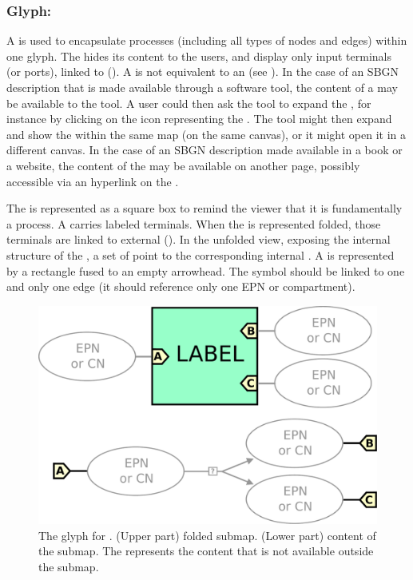 \subsubsection{Glyph: }
\label{sec:submap}

A  is used to encapsulate processes (including all types of nodes and edges) within one glyph.  The  hides its content to the users, and display only input terminals (or ports), linked to  (). A  is not equivalent to an  (see ).  
In the case of an SBGN description that is made available through a software tool, the content of a  may be available to the tool.  A user could then ask the tool to expand the , for instance by clicking on the icon representing the .  The tool might then expand and show the  within the same map (on the same canvas), or it might open it in a different canvas. In the case of an SBGN description made available in a book or a website, the content of the  may be available on another page, possibly accessible via an hyperlink on the . 

The  is represented as a square box to remind the viewer that it is fundamentally a process. A  carries labeled terminals.  When the  is represented folded, those terminals are linked to external  ().  In the unfolded view, exposing the internal structure of the , a set of  point to the corresponding internal  . A  is represented by a rectangle fused to an empty arrowhead. The symbol should be linked to one and only one edge (\ie it should reference only one EPN or compartment).

\begin{figure}[H]
  \centering
  \includegraphics[scale = 0.22]{le_images/submap}
  \caption{The \PD glyph for . (Upper part) folded submap. (Lower part) content of the submap. The  represents the content that is not available outside the submap.}
  \label{fig:submap}
\end{figure}

